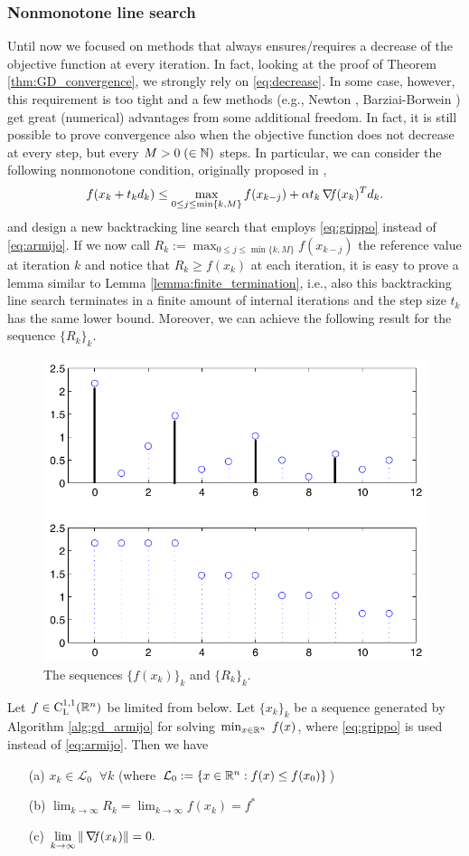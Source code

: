 \documentclass[10pt,a4paper]{article}
\begin{document}
\subsubsection{Nonmonotone line search}
Until now we focused on methods that always ensures/requires a decrease of the objective function at every iteration. In fact, looking at the proof of Theorem \ref{thm:GD_convergence}, we strongly rely on \eqref{eq:decrease}. In some case, however, this requirement is too tight and a few methods (e.g., Newton \cite{grippo86a}, Barziai-Borwein \cite{raydan97a}) get great (numerical) advantages from some additional freedom. In fact, it is still possible to prove convergence also when the objective function does not decrease at every step, but every $M>0 \;(\in\mathbb{N})$ steps. In particular, we can consider the following nonmonotone condition, originally proposed in \cite{grippo86a}, 
\begin{equation}\label{eq:grippo}
	f(x_k +t_k d_k) \leq \max_{0\leq j \leq \min\{k,M\}} f(x_{k-j}) + \alpha t_k\operatorname*{\mathit{\nabla \!f}}(x_k)^Td_k.
\end{equation}
and design a new backtracking line search that employs \eqref{eq:grippo} instead of \eqref{eq:armijo}. 
If we now call $R_k:= \displaystyle\max_{0\leq j \leq \min\{k,M\}} f(x_{k-j})$ the reference value at iteration $k$ and notice that $R_k\geq f(x_k)$ at each iteration, it is easy to prove a lemma similar to Lemma \ref{lemma:finite_termination}, i.e., also this backtracking line search terminates in a finite amount of internal iterations and the step size $t_k$ has the same lower bound. Moreover, we can achieve the following result for the sequence $\{R_k\}_k$.
\begin{figure}
	\centering
	\includegraphics[width=0.5\linewidth]{nonmonotone}
	\caption{The sequences $\{f(x_k)\}_k$ and $\{R_k\}_k$.}
\end{figure}
\begin{theorem}
	Let $f\in \mathord{\mathrm{C^{1,1}_{L}}}(\mathbb{R}^n)$ be limited from below. Let $\{x_k\}_k$ be a sequence generated by Algorithm \ref{alg:gd_armijo} for solving $\min_{x\in\mathbb{R}^n}\;f(x)$, where \eqref{eq:grippo} is used instead of \eqref{eq:armijo}. Then we have 
	\begin{itemize}
		\item[(a)] $x_k \in \mathcal{L}_0 \;\;\forall k$ (where $\mathcal{L}_0:=\{x\in\mathbb{R}^n: f(x)\leq f(x_0)\}$)
		\item[(b)] $\displaystyle\lim_{k \to \infty} R_k = \displaystyle\lim_{k \to \infty} f(x_k) = f^*$ 
		\item[(c)] $\displaystyle\lim_{k \to \infty} \|\operatorname*{\mathit{\nabla \!f}}(x_k)\| = 0.$
	\end{itemize}
\end{theorem}
\end{document}
